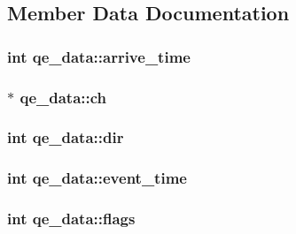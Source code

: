 \subsection{Member Data Documentation}
\hypertarget{structqe__data_a4b0ea6cfe38ebf3f6c9d4056fb8812e1}{
\subsubsection[{arrive\-\_\-time}]{\setlength{\rightskip}{0pt plus 5cm}int qe\-\_\-data\-::arrive\-\_\-time}}\label{structqe__data_a4b0ea6cfe38ebf3f6c9d4056fb8812e1}
\hypertarget{structqe__data_a74bace48d10399a7e59335bfc4e25464}{
\subsubsection[{ch}]{$\ast$ qe\-\_\-data\-::ch}}\label{structqe__data_a74bace48d10399a7e59335bfc4e25464}
\hypertarget{structqe__data_a8412f8dbe6b830f79005efe3cfc61ef4}{
\subsubsection[{dir}]{\setlength{\rightskip}{0pt plus 5cm}int qe\-\_\-data\-::dir}}\label{structqe__data_a8412f8dbe6b830f79005efe3cfc61ef4}
\hypertarget{structqe__data_ab42b52d33fe67d2a75ab2f3a7fe1aa31}{
\subsubsection[{event\-\_\-time}]{\setlength{\rightskip}{0pt plus 5cm}int qe\-\_\-data\-::event\-\_\-time}}\label{structqe__data_ab42b52d33fe67d2a75ab2f3a7fe1aa31}
\hypertarget{structqe__data_a2584860e1b67ff2a3e390be354807d8a}{
\subsubsection[{flags}]{\setlength{\rightskip}{0pt plus 5cm}int qe\-\_\-data\-::flags}}\label{structqe__data_a2584860e1b67ff2a3e390be354807d8a}
